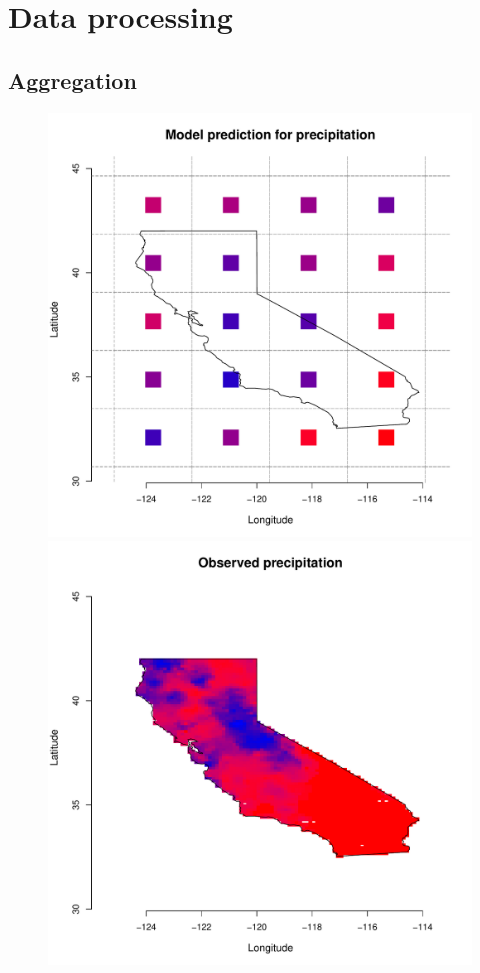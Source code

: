 \section{Data processing}
\label{process}

\subsection{Aggregation}
\label{aggregate}

\begin{figure}
\begin{center}
\includegraphics[scale=0.26]{figs/cal_mod_box1.pdf}
\includegraphics[scale=0.26]{figs/cal_mod_box2.pdf}

\end{center}
\end{figure}
